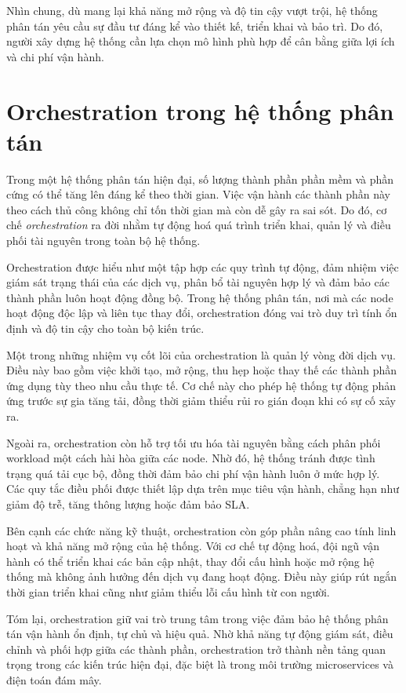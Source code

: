 Nhìn chung, dù mang lại khả năng mở rộng và độ tin cậy vượt trội, hệ thống phân tán yêu cầu sự đầu tư đáng kể vào thiết kế, triển khai và bảo trì. Do đó, người xây dựng hệ thống cần lựa chọn mô hình phù hợp để cân bằng giữa lợi ích và chi phí vận hành.

\clearpage

\section{Orchestration trong hệ thống phân tán}

Trong một hệ thống phân tán hiện đại, số lượng thành phần phần mềm và phần cứng có thể tăng lên đáng kể theo thời gian. Việc vận hành các thành phần này theo cách thủ công không chỉ tốn thời gian mà còn dễ gây ra sai sót. Do đó, cơ chế \textit{orchestration} ra đời nhằm tự động hoá quá trình triển khai, quản lý và điều phối tài nguyên trong toàn bộ hệ thống.

Orchestration được hiểu như một tập hợp các quy trình tự động, đảm nhiệm việc giám sát trạng thái của các dịch vụ, phân bổ tài nguyên hợp lý và đảm bảo các thành phần luôn hoạt động đồng bộ. Trong hệ thống phân tán, nơi mà các node hoạt động độc lập và liên tục thay đổi, orchestration đóng vai trò duy trì tính ổn định và độ tin cậy cho toàn bộ kiến trúc.

Một trong những nhiệm vụ cốt lõi của orchestration là quản lý vòng đời dịch vụ. Điều này bao gồm việc khởi tạo, mở rộng, thu hẹp hoặc thay thế các thành phần ứng dụng tùy theo nhu cầu thực tế. Cơ chế này cho phép hệ thống tự động phản ứng trước sự gia tăng tải, đồng thời giảm thiểu rủi ro gián đoạn khi có sự cố xảy ra.

Ngoài ra, orchestration còn hỗ trợ tối ưu hóa tài nguyên bằng cách phân phối workload một cách hài hòa giữa các node. Nhờ đó, hệ thống tránh được tình trạng quá tải cục bộ, đồng thời đảm bảo chi phí vận hành luôn ở mức hợp lý. Các quy tắc điều phối được thiết lập dựa trên mục tiêu vận hành, chẳng hạn như giảm độ trễ, tăng thông lượng hoặc đảm bảo SLA.

Bên cạnh các chức năng kỹ thuật, orchestration còn góp phần nâng cao tính linh hoạt và khả năng mở rộng của hệ thống. Với cơ chế tự động hoá, đội ngũ vận hành có thể triển khai các bản cập nhật, thay đổi cấu hình hoặc mở rộng hệ thống mà không ảnh hưởng đến dịch vụ đang hoạt động. Điều này giúp rút ngắn thời gian triển khai cũng như giảm thiểu lỗi cấu hình từ con người.

Tóm lại, orchestration giữ vai trò trung tâm trong việc đảm bảo hệ thống phân tán vận hành ổn định, tự chủ và hiệu quả. Nhờ khả năng tự động giám sát, điều chỉnh và phối hợp giữa các thành phần, orchestration trở thành nền tảng quan trọng trong các kiến trúc hiện đại, đặc biệt là trong môi trường microservices và điện toán đám mây.

